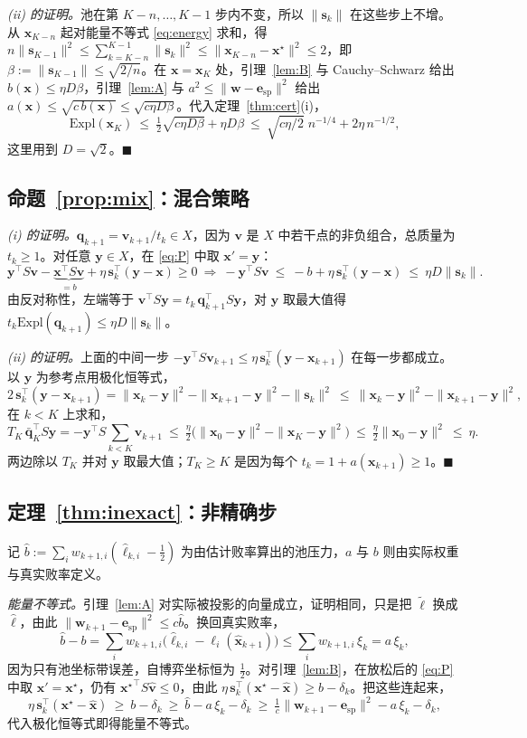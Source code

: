 \documentclass{article}
\theoremstyle{plain}
\theoremstyle{remark}
\newcommand{\Expl}{\mathrm{Expl}}
\newcommand{\bx}{{\bm{x}}}
\newcommand{\by}{{\bm{y}}}
\newcommand{\bv}{{\bm{v}}}
\newcommand{\bw}{{\bm{w}}}
\newcommand{\bq}{{\bm{q}}}
\newcommand{\be}{{\bm{e}}}
\newcommand{\bell}{{\bm{\ell}}}
\newcommand{\aug}{\tilde{\bell}}
\newcommand{\xs}{\bx^{\star}}
\newcommand{\dx}{{\bm{s}}}
\newcommand{\esp}{\be_{\mathrm{sp}}}
\begin{document}
\textit{(ii) 的证明。}池在第 $K-n,\dots,K-1$ 步内不变，所以 $\|\dx_k\|$ 在这些步上不增。从 $\bx_{K-n}$ 起对能量不等式 \eqref{eq:energy} 求和，得 $n\|\dx_{K-1}\|^2\le\sum_{k=K-n}^{K-1}\|\dx_k\|^2\le\|\bx_{K-n}-\xs\|^2\le2$，即 $\beta:=\|\dx_{K-1}\|\le\sqrt{2/n}$。在 $\bx=\bx_K$ 处，引理~\ref{lem:B} 与 Cauchy--Schwarz 给出 $b(\bx)\le\eta D\beta$，引理~\ref{lem:A} 与 $a^2\le\|\bw-\esp\|^2$ 给出 $a(\bx)\le\sqrt{c\,b(\bx)}\le\sqrt{c\eta D\beta}$。代入定理~\ref{thm:cert}(i)，
\[
\Expl(\bx_K)\ \le\ \tfrac12\sqrt{c\eta D\beta}+\eta D\beta\ \le\ \sqrt{c\eta/2}\;n^{-1/4}+2\eta\,n^{-1/2},
\]
这里用到 $D=\sqrt2$。\hfill$\blacksquare$

\subsection{命题~\ref{prop:mix}：混合策略}
\label{app:mix}

\textit{(i) 的证明。}$\bq_{k+1}=\bv_{k+1}/t_k\in X$，因为 $\bv$ 是 $X$ 中若干点的非负组合，总质量为 $t_k\ge1$。对任意 $\by\in X$，在 \eqref{eq:P} 中取 $\bx'=\by$：
\[
\by^\top S\bv-\underbrace{\bx^\top S\bv}_{=b}+\eta\,\dx_k^\top(\by-\bx)\ge0
\ \Longrightarrow\
-\by^\top S\bv\ \le\ -b+\eta\,\dx_k^\top(\by-\bx)\ \le\ \eta D\|\dx_k\| .
\]
由反对称性，左端等于 $\bv^\top S\by=t_k\,\bq_{k+1}^\top S\by$，对 $\by$ 取最大值得 $t_k\Expl(\bq_{k+1})\le\eta D\|\dx_k\|$。

\textit{(ii) 的证明。}上面的中间一步 $-\by^\top S\bv_{k+1}\le\eta\,\dx_k^\top(\by-\bx_{k+1})$ 在每一步都成立。以 $\by$ 为参考点用极化恒等式，
\[
2\,\dx_k^\top(\by-\bx_{k+1})=\|\bx_k-\by\|^2-\|\bx_{k+1}-\by\|^2-\|\dx_k\|^2\ \le\ \|\bx_k-\by\|^2-\|\bx_{k+1}-\by\|^2 ,
\]
在 $k<K$ 上求和，
\[
T_K\,\bar{\bq}_K^\top S\by=-\by^\top S\sum_{k<K}\bv_{k+1}\ \le\ \tfrac\eta2\big(\|\bx_0-\by\|^2-\|\bx_K-\by\|^2\big)\ \le\ \tfrac\eta2\|\bx_0-\by\|^2\ \le\ \eta .
\]
两边除以 $T_K$ 并对 $\by$ 取最大值；$T_K\ge K$ 是因为每个 $t_k=1+a(\bx_{k+1})\ge1$。\hfill$\blacksquare$

\subsection{定理~\ref{thm:inexact}：非精确步}
\label{app:inexact}

记 $\hat b:=\sum_iw_{k+1,i}(\hat\ell_{k,i}-\tfrac12)$ 为由估计败率算出的池压力，$a$ 与 $b$ 则由实际权重与真实败率定义。

\textit{能量不等式。}引理~\ref{lem:A} 对实际被投影的向量成立，证明相同，只是把 $\aug$ 换成 $\hat{\bell}$，由此 $\|\bw_{k+1}-\esp\|^2\le c\hat b$。换回真实败率，
\[
\hat b-b=\sum_iw_{k+1,i}\big(\hat\ell_{k,i}-\ell_i(\hat \bx_{k+1})\big)\le\sum_iw_{k+1,i}\,\xi_k=a\,\xi_k ,
\]
因为只有池坐标带误差，自博弈坐标恒为 $\tfrac12$。对引理~\ref{lem:B}，在放松后的 \eqref{eq:P} 中取 $\bx'=\xs$，仍有 ${\xs}^\top S\hat \bv\le0$，由此 $\eta\,\dx_k^\top(\xs-\hat \bx)\ge b-\delta_k$。把这些连起来，
\[
\eta\,\dx_k^\top(\xs-\hat \bx)\ \ge\ b-\delta_k\ \ge\ \hat b-a\,\xi_k-\delta_k\ \ge\ \tfrac1c\|\bw_{k+1}-\esp\|^2-a\,\xi_k-\delta_k ,
\]
代入极化恒等式即得能量不等式。
\end{document}
